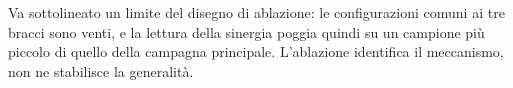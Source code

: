 Va sottolineato un limite del disegno di ablazione: le configurazioni comuni ai tre bracci sono
venti, e la lettura della sinergia poggia quindi su un campione più piccolo di quello della
campagna principale. L'ablazione identifica il meccanismo, non ne stabilisce la generalità.

